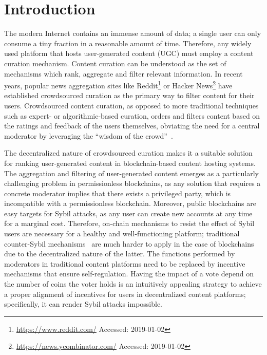 \section{Introduction}
  The modern Internet contains an immense amount of data; a single user can only consume a tiny fraction in a reasonable amount of time. Therefore, any widely used platform that hosts user-generated content (UGC) must employ a content curation mechanism.
   Content curation can be understood as the set of mechanisms which rank, aggregate and filter relevant information. In recent years, popular news aggregation sites like Reddit\footnote{\url{https://www.reddit.com/} Accessed: 2019-01-02} or Hacker News\footnote{\url{https://news.ycombinator.com/} Accessed: 2019-01-02} have established crowdsourced curation as the primary way to filter content for their users.
   Crowdsourced content curation, as opposed to more traditional techniques such as expert- or algorithmic-based curation, orders and filters content based on the ratings and feedback of the users themselves, obviating the need for a central moderator by leveraging the ``wisdom of the crowd''~\cite{askalidis2013theoretical}.

  The decentralized nature of crowdsourced curation makes it a suitable solution for ranking user-generated content in blockchain-based content hosting systems. The aggregation and filtering of user-generated content emerges as a particularly challenging problem in permissionless blockchains, as any solution that requires a concrete moderator implies that there exists a privileged party, which is incompatible with a permissionless blockchain.
   Moreover, public blockchains are easy targets for Sybil attacks, as any user can create new accounts at any time for a marginal cost.
    Therefore, on-chain mechanisms to resist the effect of Sybil users are necessary for a healthy and well-functioning platform; traditional counter-Sybil mechanisms~\cite{levine2006survey} are much harder to apply in the case of blockchains due to the decentralized nature of the latter.
   The functions performed by moderators in traditional content platforms need to be replaced by incentive mechanisms that ensure self-regulation. Having the impact of a vote depend on the number of coins the voter holds is an intuitively appealing strategy to achieve a proper alignment of incentives for users in decentralized content platforms; specifically, it can render Sybil attacks impossible.

